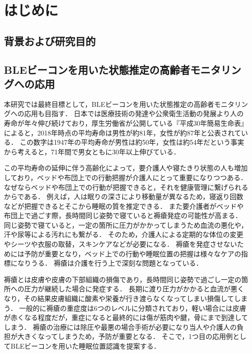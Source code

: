 \chapter{はじめに}
\thispagestyle{myheadings}

\section{背景および研究目的}



\section{BLEビーコンを用いた状態推定の高齢者モニタリングへの応用}
\label{sec:example}

本研究では最終目標として，BLEビーコンを用いた状態推定の高齢者モニタリングへの応用も目指す．
日本では医療技術の発達や公衆衛生活動の発展より人の寿命が年々伸び続けており，厚生労働省が公開している『平成30年簡易生命表』\cite{AveLife}によると，2018年時点の平均寿命は男性が約81年，女性が約87年と公表されている．
この数字は1947年の平均寿命が男性は約50年，女性は約54年だという事実から考えると，71年間で男女ともに30年以上伸びている．


この平均寿命の延伸に伴う高齢化によって，要介護人や寝たきり状態の人も増加しており，ベッドや布団上での行動把握が介護人にとって重要になりつつある．
なぜならベッドや布団上での行動が把握できると，それを健康管理に繋げられるからである．
例えば，人は眠りの深さにより移動量が異なるため，寝返り回数などが把握できるとそこから睡眠の質を推定できる．
また要介護者がベッドや布団上で過ごす際，長時間同じ姿勢で寝ていると褥瘡発症の可能性が高まる．
同じ姿勢で寝ていると，一定の箇所に圧力がかかってしまうため血流の悪化や，汗や尿等による汚れにも繋がる．
そのため，介護人による定期的な体位の変更やシーツや衣服の取替，スキンケアなどが必要になる\cite{jokusou, mekanizumu}．
褥瘡を発症させないためには予防が重要となり，ベッド上での行動や睡眠位置の把握は様々なケアの指標になりうる．
褥瘡は介護を行う上で深刻な問題となっている．

褥瘡とは皮膚や皮膚の下部組織の損傷であり，長時間同じ姿勢で過ごし一定の箇所への圧力が継続した場合に発症する．
長期に渡り圧力がかかると血流が悪くなり，その結果皮膚組織に酸素や栄養が行き渡らなくなってしまい損傷してしまう．
一般的に褥瘡の重症度は6つのレベルに分類\cite{level}されており，軽い場合には皮膚が赤くなる程度だが，重症になると最終的には傷が筋肉や腱，骨にまで到達してしまう．
褥瘡の治療には除圧や最悪の場合手術が必要になり当人や介護人の負担が大きくなってしまうため，予防が重要となる．
そこで，1つ目の応用例としてBLEビーコンを用いた睡眠位置認識を提案する．

